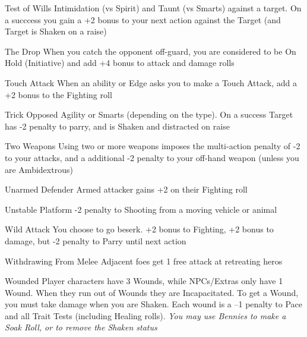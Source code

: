 \begin{genericsection}{Test of Wills}
Intimidation (vs Spirit) and Taunt (vs Smarts) against a target. On a succcess you gain a +2 bonus to your next action against the Target (and Target is Shaken on a raise)
\end{genericsection}

\begin{genericsection}{The Drop}
When you catch the opponent off-guard, you are considered to be On Hold (Initiative) and add +4 bonus to attack and damage rolls
\end{genericsection}

\begin{genericsection}{Touch Attack}
When an ability or Edge asks you to make a Touch Attack, add a +2 bonus to the Fighting roll
\end{genericsection}

\begin{genericsection}{Trick}
Opposed Agility or Smarts (depending on the type). On a success Target has -2 penalty to parry, and is Shaken and distracted on raise
\end{genericsection}

\begin{genericsection}{Two Weapons}
Using two or more weapons imposes the multi-action penalty of -2 to your attacks, and a additional -2 penalty to your off-hand weapon (unless you are Ambidextrous)
\end{genericsection}

\begin{genericsection}{Unarmed Defender}
Armed attacker gains +2 on their Fighting roll
\end{genericsection}

\begin{genericsection}{Unstable Platform}
-2 penalty to Shooting from a moving vehicle or animal
\end{genericsection}

\begin{genericsection}{Wild Attack}
You choose to go beserk. +2 bonus to Fighting, +2 bonus to damage, but -2 penalty to Parry until next action
\end{genericsection}

\begin{genericsection}{Withdrawing From Melee}
Adjacent foes get 1 free attack at retreating heros
\end{genericsection}

\begin{genericsection}{Wounded}
Player characters have 3 Wounds, while NPCs/Extras only have 1 Wound. When they run out of Wounds they are Incapacitated. To get a Wound, you must take damage when you are Shaken. Each wound is a –1 penalty to Pace and all Trait Tests (including Healing rolls). \textit{You may use Bennies to make a Soak Roll, or to remove the Shaken status}
\end{genericsection}
